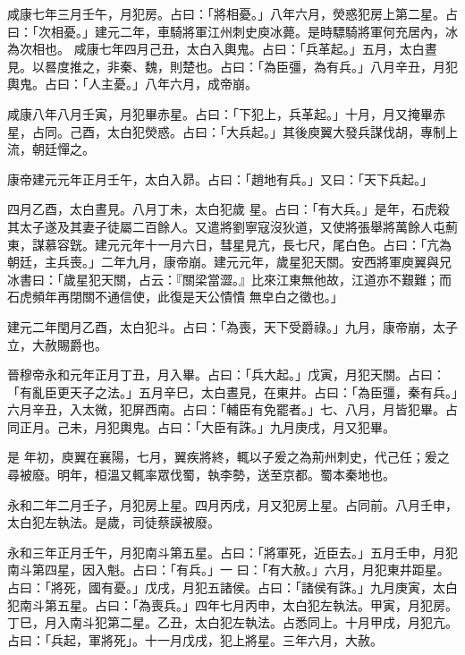 \begin{pinyinscope}
 咸康七年三月壬午，月犯房。占曰：「將相憂。」八年六月，熒惑犯房上第二星。占曰：「次相憂。」建元二年，車騎將軍江州刺史庾冰薨。是時驃騎將軍何充居內，冰為次相也。
 咸康七年四月己丑，太白入輿鬼。占曰：「兵革起。」五月，太白晝見。以晷度推之，非秦、魏，則楚也。占曰：「為臣彊，為有兵。」八月辛丑，月犯輿鬼。占曰：「人主憂。」八年六月，成帝崩。



 咸康八年八月壬寅，月犯畢赤星。占曰：「下犯上，兵革起。」十月，月又掩畢赤星，占同。己酉，太白犯熒惑。占曰：「大兵起。」其後庾翼大發兵謀伐胡，專制上流，朝廷憚之。



 康帝建元元年正月壬午，太白入昴。占曰：「趙地有兵。」又曰：「天下兵起。」



 四月乙酉，太白晝見。八月丁未，太白犯歲
 星。占曰：「有大兵。」是年，石虎殺其太子遂及其妻子徒屬二百餘人。又遣將劉寧寇沒狄道，又使將張舉將萬餘人屯薊東，謀慕容皝。建元元年十一月六日，彗星見亢，長七尺，尾白色。占曰：「亢為朝廷，主兵喪。」二年九月，康帝崩。建元元年，歲星犯天關。安西將軍庾翼與兄冰書曰：「歲星犯天關，占云：『關梁當澀。』比來江東無他故，江道亦不艱難；而石虎頻年再閉關不通信使，此復是天公憒憒
 無皁白之徵也。」



 建元二年閏月乙酉，太白犯斗。占曰：「為喪，天下受爵祿。」九月，康帝崩，太子立，大赦賜爵也。



 晉穆帝永和元年正月丁丑，月入畢。占曰：「兵大起。」戊寅，月犯天關。占曰：「有亂臣更天子之法。」五月辛巳，太白晝見，在東井。占曰：「為臣彊，秦有兵。」六月辛丑，入太微，犯屏西南。占曰：「輔臣有免罷者。」七、八月，月皆犯畢。占同正月。己未，月犯輿鬼。占曰：「大臣有誅。」九月庚戌，月又犯畢。



 是
 年初，庾翼在襄陽，七月，翼疾將終，輒以子爰之為荊州刺史，代己任；爰之尋被廢。明年，桓溫又輒率眾伐蜀，執李勢，送至京都。蜀本秦地也。



 永和二年二月壬子，月犯房上星。四月丙戌，月又犯房上星。占同前。八月壬申，太白犯左執法。是歲，司徒蔡謨被廢。



 永和三年正月壬午，月犯南斗第五星。占曰：「將軍死，近臣去。」五月壬申，月犯南斗第四星，因入魁。占曰：「有兵。」一
 曰：「有大赦。」六月，月犯東井距星。占曰：「將死，國有憂。」戊戌，月犯五諸侯。占曰：「諸侯有誅。」九月庚寅，太白犯南斗第五星。占曰：「為喪兵。」四年七月丙申，太白犯左執法。甲寅，月犯房。丁巳，月入南斗犯第二星。乙丑，太白犯左執法。占悉同上。十月甲戌，月犯亢。占曰：「兵起，軍將死」。十一月戊戌，犯上將星。三年六月，大赦。




\end{pinyinscope}
